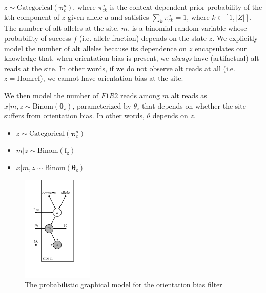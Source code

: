 \documentclass[a4paper]{article}
\newcommand{\vpi}{{\bm \pi}}
\newcommand{\vtheta}{{\bm \theta}}
\begin{document}
$z \sim \mathrm{Categorical}(\vpi^a_c)$, where $\pi^a_{ck}$ is the context dependent prior probability of the kth component of $z$ given allele $a$ and satisfies $\sum_k \pi^a_{ck} = 1$, where $k \in [1, |Z|]$. The number of alt alleles at the site, $m$, is a binomial random variable whose probability of success $f$ (i.e. allele fraction) depends on the state $z$. We explicitly model the number of alt alleles because its dependence on $z$ encapsulates our knowledge that, when orientation bias is present, we \textit{always} have (artifactual) alt reads at the site. In other words, if we do not observe alt reads at all (i.e. $z = \mathrm{Hom ref}$), we cannot have orientation bias at the site. 

We then model the number of $F1R2$ reads among $m$ alt reads as $x|m,z \sim \mathrm{Binom(\vtheta_z)}$, parameterized by $\theta_z$ that depends on whether the site suffers from orientation bias. In other words, $\theta$ depends on $z$. 

\begin{itemize}
\item $z \sim \mathrm{Categorical}(\vpi^a_c)$
\item $m | z \sim \mathrm{Binom(f_z)}$
\item $x | m,z \sim \mathrm{Binom(\vtheta_z)}$
\end{itemize}

\begin{figure}
\centering
\includegraphics[width=0.3\textwidth]{pgm.png}
\caption{\label{fig:pgm} The probabilistic graphical model for the orientation bias filter}
\end{figure}
\end{document}

